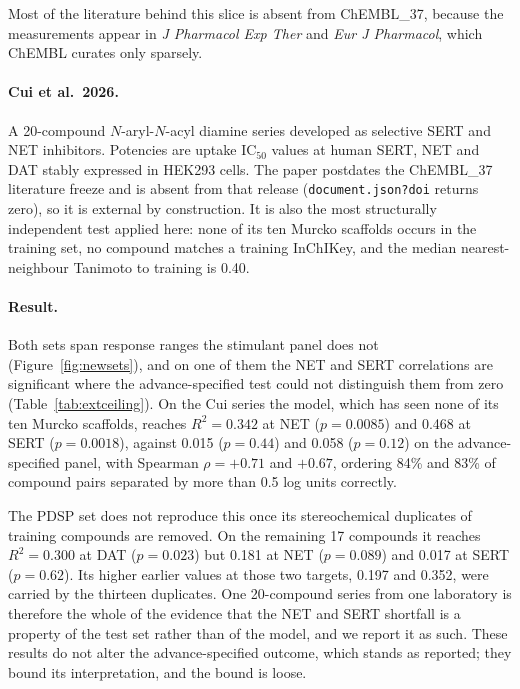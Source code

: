 \documentclass[11pt,a4paper]{article}
\begin{document}
Most of the literature behind this slice is absent from ChEMBL\_37, because the
measurements appear in \textit{J Pharmacol Exp Ther} and \textit{Eur J Pharmacol}, which
ChEMBL curates only sparsely.

\paragraph{Cui et al.\ 2026.} A 20-compound $N$-aryl-$N$-acyl diamine series developed
as selective SERT and NET inhibitors.\cite{Cui2026} Potencies are uptake IC$_{50}$ values
at human SERT, NET and DAT stably expressed in HEK293 cells. The paper postdates the ChEMBL\_37
literature freeze and is absent from that release
(\texttt{document.json?doi} returns zero), so it is external by construction. It is also
the most structurally independent test applied here: none of its ten Murcko scaffolds
occurs in the training set, no compound matches a training InChIKey, and the median
nearest-neighbour Tanimoto to training is 0.40.

\paragraph{Result.} Both sets span response ranges the stimulant panel does not
(Figure~\ref{fig:newsets}), and on one of them the NET and SERT correlations are
significant where the advance-specified test could not distinguish them from zero
(Table~\ref{tab:extceiling}). On the Cui series the model, which has seen none of its
ten Murcko scaffolds, reaches $R^2=0.342$ at NET ($p=0.0085$) and 0.468 at SERT
($p=0.0018$), against 0.015 ($p=0.44$) and 0.058 ($p=0.12$) on the advance-specified panel,
with Spearman $\rho=+0.71$ and $+0.67$, ordering 84\% and 83\% of compound pairs
separated by more than 0.5 log units correctly.

The PDSP set does not reproduce this once its stereochemical duplicates of training
compounds are removed. On the remaining 17 compounds it reaches $R^2=0.300$ at DAT
($p=0.023$) but 0.181 at NET ($p=0.089$) and 0.017 at SERT ($p=0.62$). Its higher
earlier values at those two targets, 0.197 and 0.352, were carried by the thirteen
duplicates. One 20-compound series from one laboratory is therefore the whole of the
evidence that the NET and SERT shortfall is a property of the test set rather than of
the model, and we report it as such. These results do not alter the advance-specified
outcome, which stands as reported; they bound its interpretation, and the bound is
loose.
\end{document}
